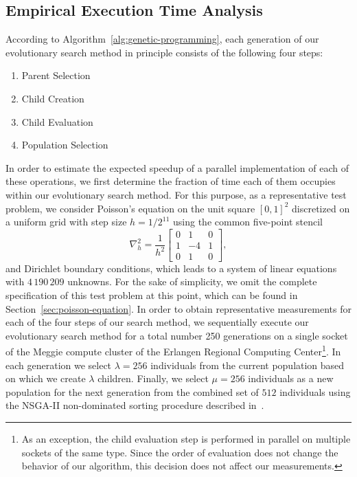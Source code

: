 \subsection{Empirical Execution Time Analysis}
\label{sec:execution-time-analysis}
According to Algorithm~\ref{alg:genetic-programming}, each generation of our evolutionary search method in principle consists of the following four steps:
\begin{enumerate}
	\item Parent Selection
	\item Child Creation
	\item Child Evaluation
	\item Population Selection
\end{enumerate}
In order to estimate the expected speedup of a parallel implementation of each of these operations, we first determine the fraction of time each of them occupies within our evolutionary search method.
For this purpose, as a representative test problem, we consider Poisson's equation on the unit square $\left[0,1\right]^2$ discretized on a uniform grid with step size $h = 1/2^{11}$ using the common five-point stencil
\begin{equation*}
	\nabla^2_h = 
	\frac{1}{h^2} \begin{bmatrix}
		0 & 1 & 0\\
		1 & -4 & 1 \\
		0 & 1 & 0  
	\end{bmatrix},
\end{equation*}
and Dirichlet boundary conditions, which leads to a system of linear equations with $4\,190\,209$ unknowns.
For the sake of simplicity, we omit the complete specification of this test problem at this point, which can be found in Section~\ref{sec:poisson-equation}.
In order to obtain representative measurements for each of the four steps of our search method, we sequentially execute our evolutionary search method for a total number 250 generations on a single socket of the Meggie compute cluster of the Erlangen Regional Computing Center\footnote{As an exception, the child evaluation step is performed in parallel on multiple sockets of the same type. Since the order of evaluation does not change the behavior of our algorithm, this decision does not affect our measurements.}.
In each generation we select $\lambda = 256$ individuals from the current population based on which we create $\lambda$ children.
Finally, we select $\mu = 256$ individuals as a new population for the next generation from the combined set of $512$ individuals using the NSGA-II non-dominated sorting procedure described in~\cite{deb2002fast}.
